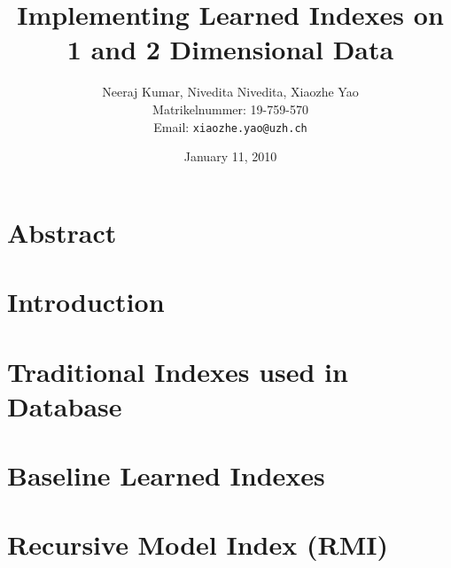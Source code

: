 \documentclass[a4paper,12pt]{scrreprt}
\title{Implementing Learned Indexes on 1 and 2 Dimensional Data}
\author{
  Neeraj Kumar, Nivedita Nivedita, Xiaozhe Yao\\[-5pt]
  \scriptsize Matrikelnummer: 19-759-570\\[-5pt]
  \scriptsize Email: \texttt{xiaozhe.yao@uzh.ch}
}
\date{\vspace*{2cm}January 11, 2010}
\begin{document}
\maketitle

\begin{abstract}
	
\end{abstract}

\chapter*{Abstract}

\chapter{Introduction}



\chapter{Traditional Indexes used in Database}



\chapter{Baseline Learned Indexes}



\chapter{Recursive Model Index (RMI)}






\end{document}
